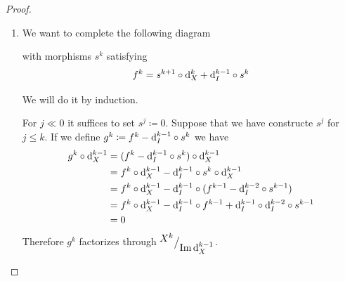 \documentclass[../../main]{subfiles}
\begin{document}
\begin{proof}~
  \begin{enumerate}
    \item We want to complete the following diagram
          \begin{center}
          \end{center}
          with morphisms \(s^{k}\) satisfying
          \begin{equation*}
            f^{k} = s^{k+1} \circ \mathrm{d}_{X}^{k} + \mathrm{d}_{I}^{k-1} \circ s^{k}
          \end{equation*}

          We will do it by induction.
          
          For \(j \ll 0\) it suffices to set \(s^{j} \coloneq 0\).
          Suppose that we have constructe \(s^{j}\) for \(j \leq k\).
          If we define \(g^{k} \coloneq f^{k} - \mathrm{d}_{I}^{k-1} \circ s^{k}\) we have
          \begin{align*}
            g^{k} \circ \mathrm{d}_{X}^{k-1} &= (f^{k} - \mathrm{d}_{I}^{k-1} \circ s^{k}) \circ \mathrm{d}_{X}^{k-1} \\
                                 &= f^{k} \circ \mathrm{d}_{X}^{k-1} - \mathrm{d}_{I}^{k-1} \circ s^{k} \circ \mathrm{d}_{X}^{k-1} \\
                                 &= f^{k} \circ \mathrm{d}_{X}^{k-1} - \mathrm{d}_{I}^{k-1} \circ (f^{k-1} - \mathrm{d}_{I}^{k-2} \circ s^{k-1}) \\
                                 &= f^{k} \circ \mathrm{d}_{X}^{k-1} - \mathrm{d}_{I}^{k-1} \circ f^{k-1} + \mathrm{d}_{I}^{k-1} \circ \mathrm{d}_{I}^{k-2} \circ s^{k-1} \\
                                 &= 0
          \end{align*}
          Therefore \(g^{k}\) factorizes through \({^{\textstyle X^{k}}\big/_{\textstyle \operatorname{Im} \mathrm{d}_{X}^{k-1}}}\).


\end{enumerate}
\end{proof}
\end{document}
